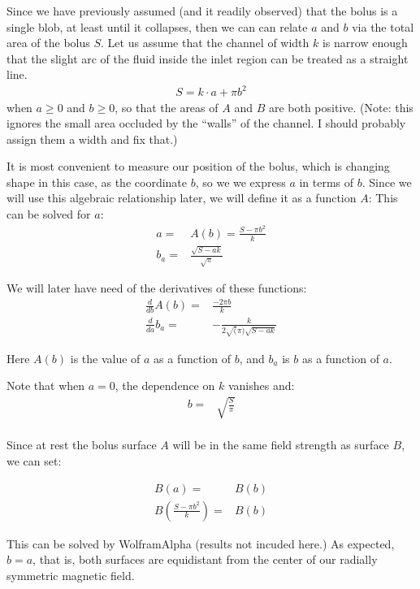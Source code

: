 \documentclass{asme2ej}
\begin{document}
Since we have previously assumed (and it readily observed) that the bolus is a single blob,
at least until it collapses, then we can can relate $a$ and $b$
via the total area of the bolus $S$.
Let us assume that the channel of width $k$ is narrow enough
that the slight arc of the fluid inside the inlet region can be treated as a
straight line.
\begin{align}
S = k \cdot a + \pi b^2
\end{align}
when $a \geq 0$ and $b \geq 0$, so that the areas of $A$ and $B$ are both positive.
(Note: this ignores the small area occluded by the ``walls'' of the channel.
I should probably assign them a width and fix that.)

It is most convenient to measure our position of the bolus, which is
changing shape in this case, as the coordinate $b$, so we we express
$a$ in terms of $b$. Since we will use this algebraic relationship later, we will define it as a function $A$:
This can be solved for $a$:
\begin{align}
  a = & A(b) = \frac{S - \pi b^2}{k} \\
  b_a = & \frac{\sqrt{S - ak}}{\sqrt{\pi}}
  \label{eqn:afromS}
\end{align}

We will later have need of the derivatives of these functions:
\begin{align}
  \frac{d}{db} A(b) = & \frac{- 2\pi b}{k} \\
  \frac{d}{da} b_a = &  -\frac{k}{2 \sqrt(\pi) \sqrt{S - a k}}
  \label{eqn:afromS}
\end{align}



Here $A(b)$ is the value of $a$ as a function of $b$, and $b_a$ is $b$ as a function of $a$.

Note that when $a = 0$, the dependence on $k$ vanishes and:
\begin{align}
  b = & \sqrt{\frac{S}{\pi}} \\
  \label{eq:maximalB}
\end{align}

Since at rest the bolus surface $A$ will be in the same field strength as surface $B$, we can set:

\begin{align}
  B(a) = & B(b) \\
  B(\frac{S - \pi b^2 }{k}) = & B(b)
\end{align}


This can be solved by WolframAlpha (results not incuded here.)
As expected, $ b = a $, that is, both surfaces are equidistant from the
center of our radially symmetric magnetic field.
\end{document}
